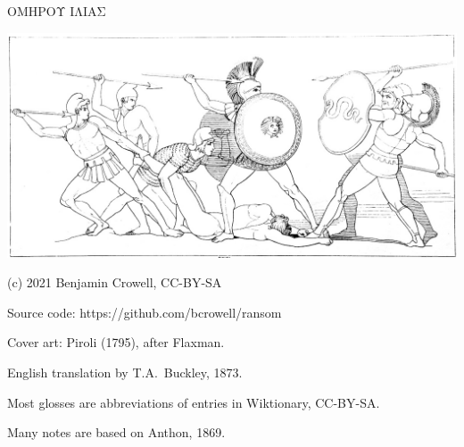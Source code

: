 \pagestyle{empty}

\vspace{25mm} %

\begin{center}

{\huge ΟΜΗΡΟΥ ΙΛΙΑΣ }

\vspace{10mm}

\includegraphics{iliad/figs/ajax-and-patroclus-body}

\vfill

\end{center}

\pagebreak

(c) 2021 Benjamin Crowell, CC-BY-SA

Source code: https://github.com/bcrowell/ransom

Cover art: Piroli (1795), after Flaxman.


English translation by T.A.~Buckley, 1873.

Most glosses are abbreviations of entries in Wiktionary, CC-BY-SA.

Many notes are based on Anthon, 1869.
